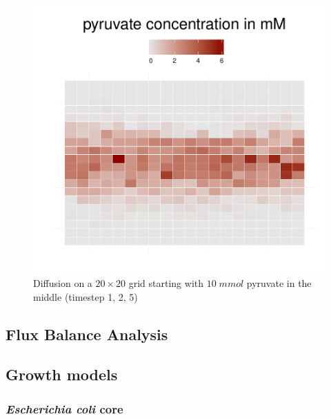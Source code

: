 \begin{figure}[h]
\begin{minipage}[t]{0.3\textwidth}
  \end{minipage}
  \begin{minipage}[t]{0.3\textwidth}
    \includegraphics[width=\textwidth]{diff5.pdf}
  \end{minipage}
  \caption{Diffusion on a $20\times20$ grid starting with $10\; mmol$ pyruvate in the middle (timestep 1, 2, 5)}
\end{figure}

\subsection{Flux Balance Analysis}
\subsection{Growth models}
\clearpage
\subsubsection{\textit{Escherichia coli} core}

